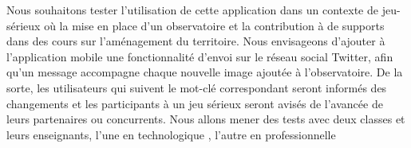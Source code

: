  Nous souhaitons tester l'utilisation de cette application  dans un contexte de jeu-sérieux où la mise en place d'un observatoire et la contribution à  de supports dans des cours sur l'aménagement du territoire.  Nous envisageons d’ajouter à l’application mobile une fonctionnalité d’envoi sur le réseau social Twitter, afin qu'un message accompagne chaque  nouvelle image ajoutée à l'observatoire. De la sorte, les utilisateurs qui suivent le mot-clé correspondant seront informés des changements et les participants à un jeu sérieux seront avisés de l’avancée de leurs partenaires ou  concurrents.  Nous allons mener des tests avec deux classes et leurs enseignants,  l'une en  technologique , l'autre en  professionnelle  